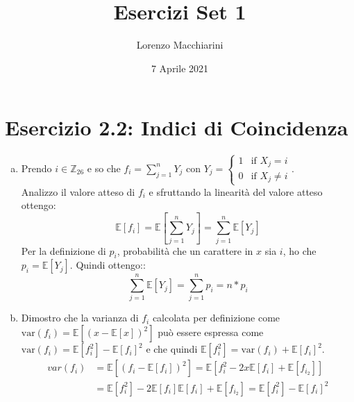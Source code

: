 \documentclass{article}
\title{Esercizi Set 1}
\author{Lorenzo Macchiarini}
\date{7 Aprile 2021}
\begin{document}
\maketitle

\section*{Esercizio 2.2: Indici di Coincidenza}
\begin{enumerate}[a.]
    \item Prendo $i \in \mathbb{Z}_{26}$ e so che $f_i = \sum^{n}_{j = 1}{Y_j}$ con $Y_j =
            \begin{cases}
              1 & \text{if $X_j = i$}\\
              0 & \text{if $X_j \ne i$}
            \end{cases} $.\\
        Analizzo il valore atteso di $f_i$ e sfruttando la linearità del valore atteso ottengo:
        \begin{equation}
            \mathbb{E}[f_i] = \mathbb{E}[\sum^{n}_{j = 1}{Y_j}] = \sum^{n}_{j = 1}{\mathbb{E}[Y_j]}
        \end{equation}
        Per la definizione di $p_i$, probabilità che un carattere in $x$ sia $i$, ho che $p_i = \mathbb{E}[Y_j]$. Quindi ottengo::
        \begin{equation}
            \sum^{n}_{j = 1}{\mathbb{E}[Y_j]} = \sum^{n}_{j = 1}{p_i} = n*p_i
        \end{equation}
        
    \item Dimostro che la varianza di $f_i$ calcolata per definizione come $\text{var}(f_i) = \mathbb{E}[(x-\mathbb{E}[x])^2]$ può essere espressa come $\text{var}(f_i) = \mathbb{E}[f^2_i] - \mathbb{E}[f_i]^2$ e che quindi $\mathbb{E}[f^2_i] = \text{var}(f_i) + \mathbb{E}[f_i]^2$.
        \begin{equation}
        \begin{split}
            var(f_i) &= \mathbb{E}[(f_i-\mathbb{E}[f_i])^2] = \mathbb{E}[f_i^2 - 2x\mathbb{E}[f_i] + \mathbb{E}[f_i_2]] \\ & = \mathbb{E}[f_i^2] - 2\mathbb{E}[f_i]\mathbb{E}[f_i] + \mathbb{E}[f_i_2] = \mathbb{E}[f^2_i] - \mathbb{E}[f_i]^2 
        \end{split}
        \end{equation}
        

\end{enumerate}
\end{document}
